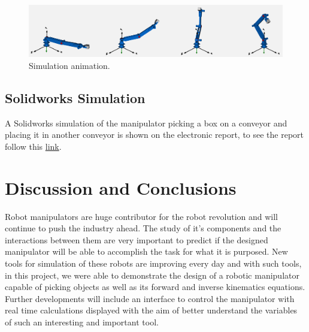 \documentclass[transmag]{IEEEtran}
\begin{document}
\begin{figure}
\centerline{\includegraphics[width=7in]{./images/SimulationAnimation}}
\caption{Simulation animation.\label{SimulationAnimation}}
\end{figure}









\subsection{Solidworks Simulation}

A Solidworks simulation of the manipulator picking a box on a conveyor and placing it in another conveyor is shown on the electronic report, to see the report follow this \textcolor{blue}{\href{https://thiagosoutogit.github.io/Masters/Pages/Automation/Assessment02RoboticArm.html}{link}}.







\section{Discussion and Conclusions}

Robot manipulators are huge contributor for the robot revolution and will continue to push the industry ahead. The study of it's components and the interactions between them are very important to predict if the designed manipulator will be able to accomplish the task for what it is purposed. New tools for simulation of these robots are improving every day and with such tools, in this project, we were able to demonstrate the design of a robotic manipulator capable of picking objects as well as its forward and inverse kinematics equations. Further developments will include an interface to control the manipulator with real time calculations displayed with the aim of better understand the variables of such an interesting and important tool.


\clearpage
\newpage
\end{document}

